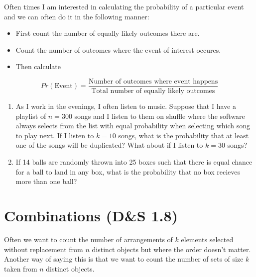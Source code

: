 \documentclass[]{book}
\providecommand{\tightlist}{%
  \setlength{\itemsep}{0pt}\setlength{\parskip}{0pt}}
\begin{document}
Often times I am interested in calculating the probability of a
particular event and we can often do it in the following manner:

\begin{itemize}
\tightlist
\item
  First count the number of equally likely outcomes there are.\\
\item
  Count the number of outcomes where the event of interest occures.
\item
  Then calculate
\end{itemize}

\[Pr\left( \textrm{Event} \right ) = \frac{\textrm{Number of outcomes where event happens}}{\textrm{Total number of equally likely outcomes}}\]

\begin{enumerate}
\def\labelenumi{\arabic{enumi}.}
\setcounter{enumi}{8}
\item
  As I work in the evenings, I often listen to music. Suppose that I
  have a playlist of \(n=300\) songs and I listen to them on shuffle
  where the software always selects from the list with equal probability
  when selecting which song to play next. If I listen to \(k=10\) songs,
  what is the probability that at least one of the songs will be
  duplicated? What about if I listen to \(k=30\) songs?
\item
  If 14 balls are randomly thrown into 25 boxes such that there is equal
  chance for a ball to land in any box, what is the probability that no
  box recieves more than one ball?
\end{enumerate}

\section{Combinations (D\&S 1.8)}\label{combinations-ds-1.8}

Often we want to count the number of arrangements of \(k\) elements
selected without replacement from \(n\) distinct objects but where the
order doesn't matter. Another way of saying this is that we want to
count the number of sets of size \(k\) taken from \(n\) distinct
objects.
\end{document}
